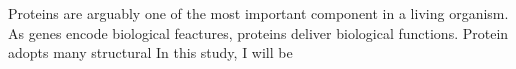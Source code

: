 Proteins are arguably one of the most important component in a living organism. As genes encode biological feactures, proteins deliver biological functions. Protein adopts many structural   In this study, I will be 